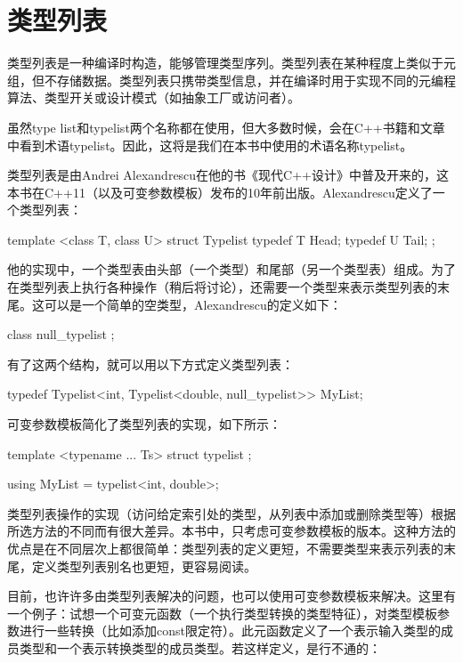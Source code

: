 \section{类型列表}

类型列表是一种编译时构造，能够管理类型序列。类型列表在某种程度上类似于元组，但不存储数据。类型列表只携带类型信息，并在编译时用于实现不同的元编程算法、类型开关或设计模式（如抽象工厂或访问者）。

\begin{important}
虽然type list和typelist两个名称都在使用，但大多数时候，会在C++书籍和文章中看到术语typelist。因此，这将是我们在本书中使用的术语名称typelist。
\end{important}

类型列表是由Andrei Alexandrescu在他的书《现代C++设计》中普及开来的，这本书在C++11（以及可变参数模板）发布的10年前出版。Alexandrescu定义了一个类型列表：

\begin{cpp}
template <class T, class U>
struct Typelist
{
	typedef T Head;
	typedef U Tail;
};
\end{cpp}

他的实现中，一个类型表由头部（一个类型）和尾部（另一个类型表）组成。为了在类型列表上执行各种操作（稍后将讨论），还需要一个类型来表示类型列表的末尾。这可以是一个简单的空类型，Alexandrescu的定义如下：

\begin{cpp}
class null_typelist {};
\end{cpp}

有了这两个结构，就可以用以下方式定义类型列表：

\begin{cpp}
typedef Typelist<int,
				 Typelist<double, null_typelist>> MyList;
\end{cpp}

可变参数模板简化了类型列表的实现，如下所示：

\begin{cpp}
template <typename ... Ts>
struct typelist {};

using MyList = typelist<int, double>;
\end{cpp}

类型列表操作的实现（访问给定索引处的类型，从列表中添加或删除类型等）根据所选方法的不同而有很大差异。本书中，只考虑可变参数模板的版本。这种方法的优点是在不同层次上都很简单：类型列表的定义更短，不需要类型来表示列表的末尾，定义类型列表别名也更短，更容易阅读。

目前，也许许多由类型列表解决的问题，也可以使用可变参数模板来解决。这里有一个例子：试想一个可变元函数（一个执行类型转换的类型特征），对类型模板参数进行一些转换（比如添加const限定符）。此元函数定义了一个表示输入类型的成员类型和一个表示转换类型的成员类型。若这样定义，是行不通的：

